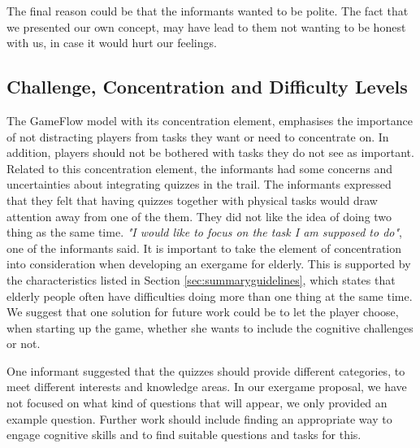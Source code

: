 The final reason could be that the informants wanted to be polite. The fact that we presented our own concept, may have lead to them not wanting to be honest with us, in case it would hurt our feelings. 

\subsection{Challenge, Concentration and Difficulty Levels}

The GameFlow model with its concentration element, emphasises the importance of not distracting players from tasks they want or need to concentrate on. In addition, players should not be bothered with tasks they do not see as important. Related to this concentration element, the informants had some concerns and uncertainties about integrating quizzes in the trail. The informants expressed that they felt that having quizzes together with physical tasks would draw attention away from one of the them. They did not like the idea of doing two thing as the same time. \emph{"I would like to focus on the task I am supposed to do"}, one of the informants said. It is important to take the element of concentration into consideration when developing an exergame for elderly. This is supported by the characteristics listed in Section \ref{sec:summaryguidelines}, which states that elderly people often have difficulties doing more than one thing at the same time. We suggest that one solution for future work could be to let the player choose, when starting up the game, whether she wants to include the cognitive challenges or not. 

One informant suggested that the quizzes should provide different categories, to meet different interests and knowledge areas. In our exergame proposal, we have not focused on what kind of questions that will appear, we only provided an example question. Further work should include finding an appropriate way to engage cognitive skills and to find suitable questions and tasks for this.

